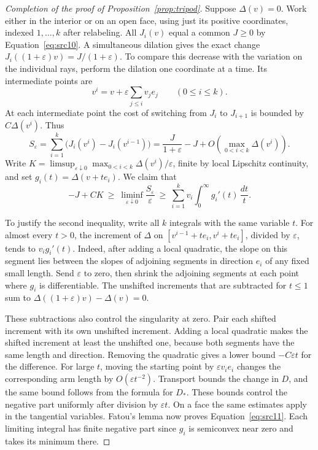 \begin{proof}[Completion of the proof of Proposition~\ref{prop:tripod}]
Suppose $\Delta(v)=0$. Work either in the interior or on an open face,
using just its positive coordinates, indexed $1,\ldots,k$ after
relabeling. All $J_i(v)$ equal a common $J\ge0$ by
Equation~\eqref{eq:src10}. A simultaneous dilation gives the exact
change $J_i((1+\varepsilon)v)=J/(1+\varepsilon)$. To compare this
decrease with the variation on the individual rays, perform the
dilation one coordinate at a time. Its intermediate points are
\[
          v^i=v+\varepsilon\sum_{j\le i}v_j e_j
               \qquad(0\le i\le k).
\]
At each intermediate point the cost of switching from $J_i$ to
$J_{i+1}$ is bounded by $C\Delta(v^i)$. Thus
\[
 S_\varepsilon=\sum_{i=1}^k\big(J_i(v^i)-J_i(v^{i-1})\big)
   =\frac{J}{1+\varepsilon}-J+
                  O\!\left(\max_{0<i<k}\Delta(v^i)\right).
\]
Write $K=\limsup_{\varepsilon\downarrow0}
\max_{0<i<k}\Delta(v^i)/\varepsilon$, finite by local Lipschitz
continuity, and set $g_i(t)=\Delta(v+te_i)$. We claim that
\begin{equation}\label{eq:src11}
 -J+CK\ \ge\ \liminf_{\varepsilon\downarrow0}
              \frac{S_\varepsilon}{\varepsilon}
        \ \ge\ \sum_{i=1}^k v_i\int_0^\infty g_i'(t)\,\frac{dt}{t}.
\end{equation}

To justify the second inequality, write all $k$ integrals with the
same variable $t$. For almost every $t>0$, the increment of $\Delta$
on $[v^{i-1}+te_i,v^i+te_i]$, divided by $\varepsilon$, tends to
$v_i g_i'(t)$. Indeed, after adding a local quadratic, the slope
on this segment lies between the slopes of adjoining segments in
direction $e_i$ of any fixed small length. Send $\varepsilon$ to
zero, then shrink the adjoining segments at each point where $g_i$
is differentiable. The unshifted increments that are subtracted for
$t\le1$ sum to $\Delta((1+\varepsilon)v)-\Delta(v)=0$.

These subtractions also control the singularity at zero. Pair each
shifted increment with its own unshifted increment. Adding a local
quadratic makes the shifted increment at least the unshifted one,
because both segments have the same length and direction. Removing
the quadratic gives a lower bound $-C\varepsilon t$ for the
difference. For large $t$, moving the starting point by
$\varepsilon v_i e_i$ changes the corresponding arm length by
$O(\varepsilon t^{-2})$. Transport bounds the change in $D$, and
the same bound follows from the formula for $D_*$. These bounds
control the negative part uniformly after division by $\varepsilon t$.
On a face the same estimates apply in the tangential variables.
Fatou's lemma now proves Equation~\eqref{eq:src11}. Each limiting
integral has finite negative part since $g_i$ is semiconvex near
zero and takes its minimum there.


\end{proof}
